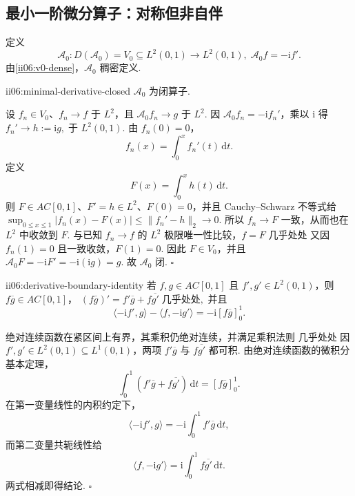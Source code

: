 \subsection{最小一阶微分算子：对称但非自伴}

定义
\[
\mathcal A_0:D(\mathcal A_0)=V_0\subseteq L^2(0,1)\to L^2(0,1),
\;
\mathcal A_0f=-\mathrm{i}f'.
\]
由\autoref{ii06:v0-dense}，\(\displaystyle\mathcal A_0\) 稠密定义.

\begin{FAProposition}[B][最小一阶微分算子的闭性]{ii06:minimal-derivative-closed}
\(\displaystyle\mathcal A_0\) 为闭算子.
\end{FAProposition}

\begin{FAProof}
设 \(\displaystyle f_n\in V_0\)、\(\displaystyle f_n\to f\) 于 \(\displaystyle L^2\)，且 \(\displaystyle\mathcal A_0f_n\to g\) 于 \(\displaystyle L^2\). 因 \(\displaystyle\mathcal A_0f_n=-\mathrm{i}f_n'\)，乘以 \(\displaystyle\mathrm{i}\) 得
\(\displaystyle f_n'\longrightarrow h:=\mathrm{i}g ,\;\text{于 }L^2(0,1).\)
由 \(\displaystyle f_n(0)=0\)，
\[
f_n(x)
=
\int_0^x f_n'(t)\,\mathrm{d}t.
\]
定义
\[
F(x)
=
\int_0^x h(t)\,\mathrm{d}t.
\]
则 \(\displaystyle F\in AC[0,1]\)、\(\displaystyle F'=h\in L^2\)、\(\displaystyle F(0)=0\)，并且 Cauchy--Schwarz 不等式给
\(\displaystyle \sup_{0\leqslant x\leqslant1}|f_n(x)-F(x)| \leqslant \|f_n'-h\|_2 \longrightarrow0.\)
所以 \(\displaystyle f_n\to F\) 一致，从而也在 \(\displaystyle L^2\) 中收敛到 \(\displaystyle F\). 与已知 \(\displaystyle f_n\to f\) 的 \(\displaystyle L^2\) 极限唯一性比较，\(\displaystyle f=F\) 几乎处处 又因 \(\displaystyle f_n(1)=0\) 且一致收敛，\(\displaystyle F(1)=0\). 因此 \(\displaystyle F\in V_0\)，并且
\(\displaystyle \mathcal A_0F = -\mathrm{i}F' = -\mathrm{i}(\mathrm{i}g) = g.\)
故 \(\displaystyle\mathcal A_0\) 闭.
\hfill\(\square\)
\end{FAProof}

\begin{FALemma}[B][一阶微分的边界恒等式]{ii06:derivative-boundary-identity}
若 \(\displaystyle f,g\in AC[0,1]\) 且 \(\displaystyle f',g'\in L^2(0,1)\)，则 \(\displaystyle f\overline g\in AC[0,1]\)，
\(\displaystyle (f\overline g)' = f'\overline g+f\overline{g'} \;\text{几乎处处},\)
并且
\[
\langle-\mathrm{i}f',g\rangle
-
\langle f,-\mathrm{i}g'\rangle
=
-\mathrm{i}\left[f\overline g\right]_0^1.
\]
\end{FALemma}

\begin{FAProof}
绝对连续函数在紧区间上有界，其乘积仍绝对连续，并满足乘积法则 几乎处处 因 \(\displaystyle f',g'\in L^2(0,1)\subseteq L^1(0,1)\)，两项 \(\displaystyle f'\overline g\) 与 \(\displaystyle f\overline{g'}\) 都可积. 由绝对连续函数的微积分基本定理，
\[
\int_0^1
\left(f'\overline g+f\overline{g'}\right)\,\mathrm{d}t
=
\left[f\overline g\right]_0^1.
\]
在第一变量线性的内积约定下，
\[
\langle-\mathrm{i}f',g\rangle
=
-\mathrm{i}\int_0^1 f'\overline g\,\mathrm{d}t,
\]
而第二变量共轭线性给
\[
\langle f,-\mathrm{i}g'\rangle
=
\mathrm{i}\int_0^1 f\overline{g'}\,\mathrm{d}t.
\]
两式相减即得结论.
\hfill\(\square\)
\end{FAProof}

